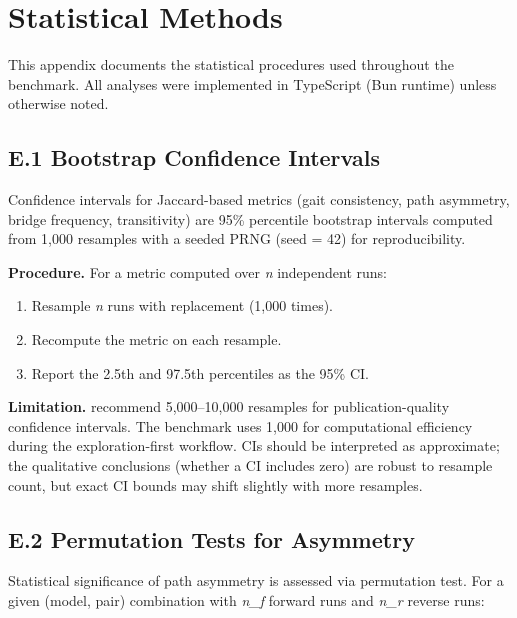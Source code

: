 \section{Statistical Methods}\label{appendix-e-statistical-methods}

This appendix documents the statistical procedures used throughout the benchmark. All analyses were implemented in TypeScript (Bun runtime) unless otherwise noted.

\subsection{E.1 Bootstrap Confidence Intervals}\label{e.1-bootstrap-confidence-intervals}

Confidence intervals for Jaccard-based metrics (gait consistency, path asymmetry, bridge frequency, transitivity) are 95\% percentile bootstrap intervals computed from 1,000 resamples with a seeded PRNG (seed = 42) for reproducibility.

\textbf{Procedure.} For a metric computed over \emph{n} independent runs:

\begin{enumerate}
\def\labelenumi{\arabic{enumi}.}
\tightlist
\item
  Resample \emph{n} runs with replacement (1,000 times).
\item
  Recompute the metric on each resample.
\item
  Report the 2.5th and 97.5th percentiles as the 95\% CI.
\end{enumerate}

\textbf{Limitation.} \citet{efron1993bootstrap} recommend 5,000--10,000 resamples for publication-quality confidence intervals. The benchmark uses 1,000 for computational efficiency during the exploration-first workflow. CIs should be interpreted as approximate; the qualitative conclusions (whether a CI includes zero) are robust to resample count, but exact CI bounds may shift slightly with more resamples.

\subsection{E.2 Permutation Tests for Asymmetry}\label{e.2-permutation-tests-for-asymmetry}

Statistical significance of path asymmetry is assessed via permutation test. For a given (model, pair) combination with \emph{n\_f} forward runs and \emph{n\_r} reverse runs:

